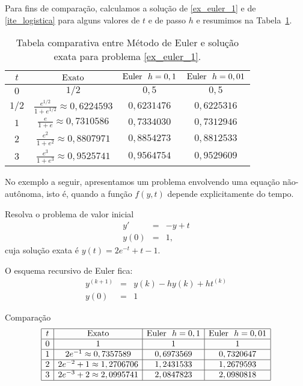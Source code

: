 Para fins de comparação, calculamos a solução de \ref{ex_euler_1} e de \eqref{ite_logistica} para alguns valores de $t$ e de passo $h$ e resumimos na Tabela~\ref{tab:log}.

\begin{table}
  \caption{Tabela comparativa entre Método de Euler e solução exata para problema \ref{ex_euler_1}.}
  \label{tab:log}
  \begin{tabular}{|c|c|c|c|}\hline
    $t$ & $\hbox{Exato}$ & $\hbox{Euler}~~ h=0,1$ & $\hbox{Euler}~~ h=0,01$\\\hline
    $0$ & $1/2$ & $0,5$ & $0,5$\\\hline
    $1/2$ & $\frac{e^{1/2}}{1+e^{1/2}}\approx 0,6224593$ & $0,6231476$ & $0,6225316$\\\hline
    $1$ & $\frac{e}{1+e}\approx 0,7310586$ & $0,7334030$ & $0,7312946$\\\hline
    $2$ & $\frac{e^2}{1+e^2}\approx  0,8807971$ & $0,8854273$  & $0,8812533$ \\\hline
    $3$ & $\frac{e^3}{1+e^3}\approx   0,9525741$  & $0,9564754$ & $0,9529609$ \\\hline
  \end{tabular}
\end{table}


No exemplo a seguir, apresentamos um problema envolvendo uma equação não-autônoma, isto é, quando a função $f(y,t)$ depende explicitamente do tempo.

\begin{ex} Resolva o problema de valor inicial
  \begin{eqnarray*}
    y'&=&-y+t\\
    y(0)&=&1,
  \end{eqnarray*}
cuja solução exata é $y(t)=2e^{-t}+t-1$.
\end{ex}
O esquema recursivo de Euler fica:
\begin{eqnarray*}
  y^{(k+1)}&=&y({k})- hy({k})+ht^{(k)}\\
  y(0)&=&1
\end{eqnarray*}

Comparação
\begin{equation*}
\begin{array}{|c|c|c|c|}\hline
t &  \hbox{Exato} & \hbox{Euler}~~ h=0,1 & \hbox{Euler}~~ h=0,01\\\hline
0 &  1 & 1 & 1\\\hline
1 &   2e^{-1}\approx 0,7357589 & 0,6973569   &   0,7320647  \\\hline
2 &   2e^{-2}+1\approx  1,2706706 &  1,2431533    &   1,2679593     \\\hline
3 &   2e^{-3}+2\approx 2,0995741  &  2,0847823 & 2,0980818   \\\hline
\end{array}  
\end{equation*}

